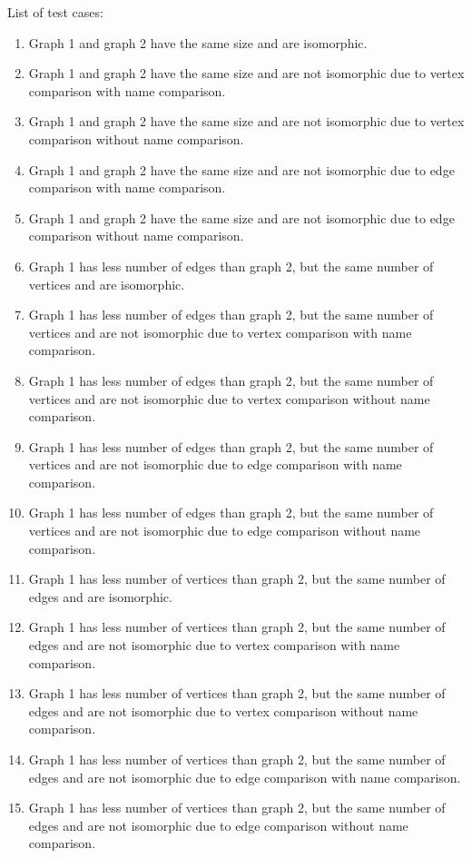 \documentclass[12pt,a4paper]{report}
\begin{document}
List of test cases:
\begin{enumerate}
  \item Graph 1 and graph 2 have the same size and are isomorphic.
  \item Graph 1 and graph 2 have the same size and are not isomorphic due to vertex comparison with name comparison.
  \item Graph 1 and graph 2 have the same size and are not isomorphic due to vertex comparison without name comparison.
  \item Graph 1 and graph 2 have the same size and are not isomorphic due to edge comparison with name comparison.
  \item Graph 1 and graph 2 have the same size and are not isomorphic due to edge comparison without name comparison.

  \item Graph 1 has less number of edges than graph 2, but the same number of vertices and are isomorphic.
  \item Graph 1 has less number of edges than graph 2, but the same number of vertices and are not isomorphic due to vertex comparison with name comparison.
  \item Graph 1 has less number of edges than graph 2, but the same number of vertices and are not isomorphic due to vertex comparison without name comparison.
  \item Graph 1 has less number of edges than graph 2, but the same number of vertices and are not isomorphic due to edge comparison with name comparison.
  \item Graph 1 has less number of edges than graph 2, but the same number of vertices and are not isomorphic due to edge comparison without name comparison.

  \item Graph 1 has less number of vertices than graph 2, but the same number of edges and are isomorphic.
  \item Graph 1 has less number of vertices than graph 2, but the same number of edges and are not isomorphic due to vertex comparison with name comparison.
  \item Graph 1 has less number of vertices than graph 2, but the same number of edges and are not isomorphic due to vertex comparison without name comparison.
  \item Graph 1 has less number of vertices than graph 2, but the same number of edges and are not isomorphic due to edge comparison with name comparison.
  \item Graph 1 has less number of vertices than graph 2, but the same number of edges and are not isomorphic due to edge comparison without name comparison.


\end{enumerate}
\end{document}
